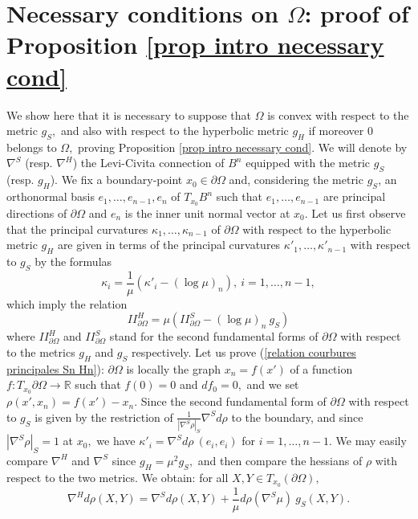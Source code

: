 \documentclass[10pt,reqno,oneside]{amsart}
\theoremstyle{definition}
\theoremstyle{remark}
\newcommand{\R}{\mathbb{R}}
\begin{document}
\section{Necessary conditions on $\Omega$: proof of Proposition \ref{prop intro necessary cond}}\label{section necessary}
We show here that it is necessary to suppose that $\Omega$ is convex with respect to the metric $g_{S},$ and also with respect to the hyperbolic metric $g_H$ if moreover $0$ belongs to $\Omega,$ proving Proposition \ref{prop intro necessary cond}. We will denote by $\nabla^S$ (resp. $\nabla^H$) the Levi-Civita connection of $B^n$ equipped with the metric $g_S$ (resp. $g_H$). We fix a boundary-point $x_0\in\partial\Omega$ and, considering the metric $g_S$, an orthonormal basis $e_1,\ldots,e_{n-1},e_n$ of $T_{x_0}B^n$ such that $e_1,\ldots,e_{n-1}$ are principal directions of $\partial\Omega$ and $e_n$ is the inner unit normal vector at $x_0$. Let us first observe that the principal curvatures $\kappa_1,\ldots,\kappa_{n-1}$ of $\partial\Omega$ with respect to the hyperbolic metric $g_{H}$ are given in terms of the principal curvatures $\kappa'_1,\ldots,\kappa'_{n-1}$ with respect to $g_{S}$ by the formulas
\begin{equation}\label{relation courbures principales Sn Hn}
\kappa_i=\frac{1}{\mu}\left(\kappa'_i-(\log\mu)_n\right),\ i=1,\ldots, n-1,
\end{equation}
which imply the relation
\begin{equation}\label{II partial Omega gS gH}
II_{\partial\Omega}^H=\mu\left(II_{\partial\Omega}^S-(\log\mu)_n\ g_S\right)
\end{equation}
where $II_{\partial\Omega}^H$ and $II_{\partial\Omega}^S$ stand for the second fundamental forms of $\partial\Omega$ with respect to the metrics $g_H$ and $g_S$ respectively. Let us prove (\ref{relation courbures principales Sn Hn}): $\partial\Omega$ is locally the graph $x_n=f(x')$ of a function $f:T_{x_0}\partial\Omega\rightarrow\R$ such that $f(0)=0$ and $df_0=0,$ and we set $\rho(x',x_n)=f(x')-x_n.$ Since the second fundamental form of $\partial\Omega$ with respect to $g_{S}$ is given by the restriction of $\frac{1}{|\nabla^S\rho|_S}\nabla^S d\rho$ to the boundary, and since $|\nabla^S\rho|_S=1$ at $x_0,$ we have $\kappa'_i=\nabla^S d\rho\ (e_i,e_i)$ for $i=1,\ldots,n-1.$ We may easily compare $\nabla^{H}$ and $\nabla^S$ since $g_H=\mu^2g_S,$ and then compare the hessians of $\rho$ with respect to the two metrics. We obtain: for all $X,Y\in T_{x_0}(\partial\Omega),$
$$\nabla^Hd\rho(X,Y)=\nabla^S d\rho(X,Y)+\frac{1}{\mu}d\rho(\nabla^S\mu)\ g_S(X,Y).$$
\end{document}
